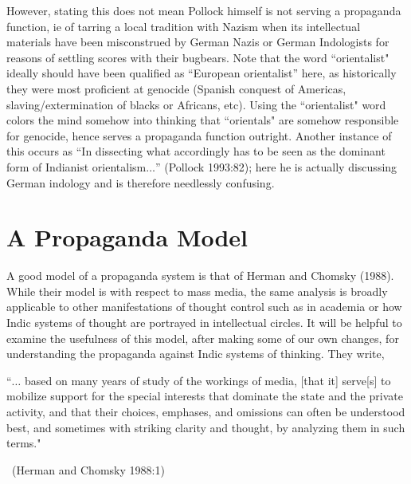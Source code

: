 However, stating this does not mean Pollock himself is not serving a propaganda function, ie of tarring a local tradition with Nazism when its intellectual materials have been misconstrued by German Nazis or German Indologists for reasons of settling scores with their bugbears. Note that the word ``orientalist" ideally should have been qualified as “European orientalist” here, as historically they were most proficient at genocide (Spanish conquest of Americas, slaving/extermination of blacks or Africans, etc). Using the ``orientalist" word colors the mind somehow into thinking that ``orientals" are somehow responsible for genocide, hence serves a propaganda function outright. Another instance of this occurs as “In dissecting what accordingly has to be seen as the dominant form of Indianist orientalism$\ldots$” (Pollock 1993:82); here he is actually discussing German indology and is therefore needlessly confusing.

\section*{A Propaganda Model}
A good model of a propaganda system is that of Herman and Chomsky (1988). While their model is with respect to mass media, the same analysis is broadly applicable to other manifestations of thought control such as in academia or how Indic systems of thought are portrayed in intellectual circles. It will be helpful to examine the usefulness of this model, after making some of our own changes, for understanding the propaganda against Indic systems of thinking. They write, 
\smallskip

\begin{myquote}
``$\ldots$ based on many years of study of the workings of media, [that it] serve[s] to mobilize support for the special interests that dominate the state and the private activity, and that their choices, emphases, and omissions can often be understood best, and sometimes with striking clarity and thought, by analyzing them in such terms."

~\hfill(Herman and Chomsky 1988:1)
\end{myquote}
\smallskip

